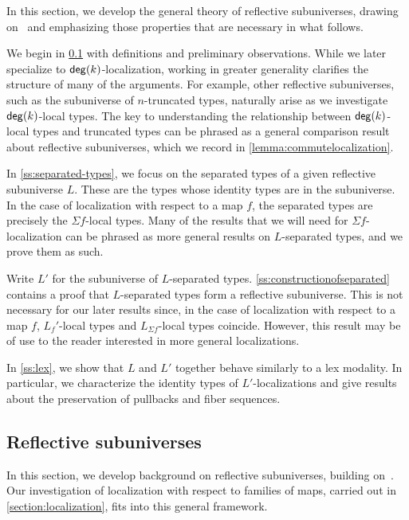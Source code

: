 In this section, we develop the general theory of reflective subuniverses, drawing on~\cite{RijkeShulmanSpitters} and emphasizing those properties that are necessary in what follows. 

We begin in \cref{subsection:reflectivesubuniverses} with definitions and preliminary observations. While we later specialize to $\mathsf{deg}(k)$-localization, working in greater generality clarifies the structure of many of the arguments. For example, other reflective subuniverses, such as the subuniverse of $n$-truncated types, naturally arise as we investigate $\mathsf{deg}(k)$-local types. The key to understanding the relationship between $\mathsf{deg}(k)$-local types and truncated types can be phrased as a general comparison result about reflective subuniverses, which we record in \cref{lemma:commutelocalization}.

In \cref{ss:separated-types}, we focus on the separated types of a given reflective subuniverse $L$. These are the types whose identity types are in the subuniverse. In the case of localization with respect to a map $f$, the separated types are precisely the $\Sigma f$-local types. Many of the results that we will need for $\Sigma f$-localization can be phrased as more general results on $L$-separated types, and we prove them as such. 

Write $L'$ for the subuniverse of $L$-separated types.
\cref{ss:constructionofseparated} contains a proof that $L$-separated types form a reflective subuniverse. This is not necessary for our later results since, in the case of localization with respect to a map $f$, $L_f'$-local types and $L_{\Sigma f}$-local types coincide. However, this result may be of use to the reader interested in more general localizations.

In \cref{ss:lex}, we show that $L$ and $L'$ together behave similarly to a lex modality.
In particular, we characterize the identity types of $L'$-localizations and
give results about the preservation of pullbacks and fiber sequences.

\subsection{Reflective subuniverses}\label{subsection:reflectivesubuniverses}

In this section, we develop background on reflective subuniverses, building on~\cite{RijkeShulmanSpitters}. Our investigation of localization with respect to families of maps, carried out in \cref{section:localization}, fits into this general framework.

